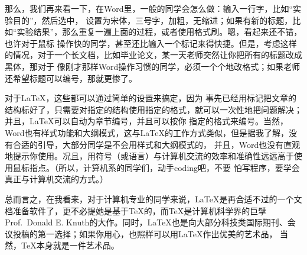 那么，我们再来看一下，在Word里，一般的同学会怎么做：输入一行字，比如“实验目的”，然后选中，
设置为宋体，三号字，加粗，无缩进；如果有新的标题，比如“实验结果”，那么重复一遍上面的过程，或者使用格式刷。嗯，看起来还不错，也许对于鼠标
操作快的同学，甚至还比输入一个标记来得快捷。但是，考虑这样的情况，对于一个长文档，比如毕业论文，某一天老师突然让你把所有的标题改成黑体，那对于
像刚才那样Word操作习惯的同学，必须一个个地改格式；如果老师还希望标题可以编号，那就更惨了。

对于\LaTeX{}，这些都可以通过简单的设置来搞定，因为
事先已经用标记把文章的结构标好了，只需要对指定的结构使用指定的格式，就可以一次性地把问题解决；并且，\LaTeX{}可以自动为章节编号，并且可以按你
指定的格式来编号。当然，Word也有样式功能和大纲模式，这与\LaTeX{}的工作方式类似，但是据我了解，没有合适的引导，大部分同学是不会用样式和大纲模式的，
并且，Word也没有直观地提示你使用。况且，用符号（或语言）与计算机交流的效率和准确性远远高于使用鼠标指点。（所以，计算机系的同学们，动手coding吧，不要
怕写程序，要学会真正与计算机交流的方式。）

总而言之，在我看来，对于计算机专业的同学来说，\LaTeX{}是再合适不过的一个文档准备软件了，更不必提她是基于\TeX{}的，而\TeX{}是计算机科学界的巨擘
Prof.~Donald E. Knuth的大作。同时，\LaTeX{}也是向大部分科技类国际期刊、会议投稿的第一选择；如果你用心，也照样可以用\LaTeX{}作出优美的艺术品，
当然，\TeX{}本身就是一件艺术品。
